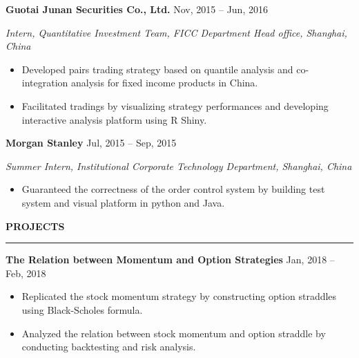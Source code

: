 \documentclass[a4paper,12pt]{report}
\newcommand{\marginAdj}{0.5in}
\begin{document}
\noindent 
\textbf{Guotai Junan Securities Co., Ltd.}{\fontsize{9pt}{9pt}\selectfont  \hspace*{3.15in}  \hspace*{\marginAdj} {\fontsize{10pt}{10pt}\selectfont Nov, 2015 – Jun, 2016}} \par
\noindent 
{\fontsize{10pt}{10pt}\selectfont \textit{Intern, Quantitative Investment Team, FICC Department Head office, Shanghai, China}} \par
\noindent 
\begin{itemize}[noitemsep,topsep=0pt]
\item {\fontsize{10pt}{10pt}\selectfont Developed pairs trading strategy based on quantile analysis and co-integration analysis for fixed income products in China.} \par
\item {\fontsize{10pt}{10pt}\selectfont Facilitated tradings by visualizing strategy performances and developing interactive analysis platform using R Shiny.} \par
\end{itemize}

\noindent 
\textbf{Morgan Stanley}{\fontsize{9pt}{9pt}\selectfont  \hspace*{4.4in} \hspace*{\marginAdj} {\fontsize{10pt}{10pt}\selectfont Jul, 2015 – Sep, 2015}} \par
\noindent 
{\fontsize{10pt}{10pt}\selectfont \textit{Summer Intern, Institutional Corporate Technology Department, Shanghai, China}} \par
\noindent 
\begin{itemize}[noitemsep,topsep=0pt]
\item {\fontsize{10pt}{10pt}\selectfont Guaranteed the correctness of the order control system by building test system and visual platform in python and Java.} \par
\end{itemize}
 \par
\vspace{9pt}



\noindent 
\textbf{PROJECTS} \par
\vspace{2pt}
\hrule
\vspace{6pt}

\noindent
\textbf{The Relation between Momentum and Option Strategies}  \hspace*{\marginAdj}  \hspace*{1.40in} {\fontsize{10pt}{10pt}\selectfont Jan, 2018 – Feb, 2018} \par
\noindent 
\begin{itemize}[noitemsep,topsep=0pt]
	\item {\fontsize{10pt}{10pt}\selectfont Replicated the stock momentum strategy by constructing option straddles using Black-Scholes formula.} \par
	\item {\fontsize{10pt}{10pt}\selectfont Analyzed the relation between stock momentum and option straddle by conducting backtesting and risk analysis.} \par
\end{itemize}
\end{document}
